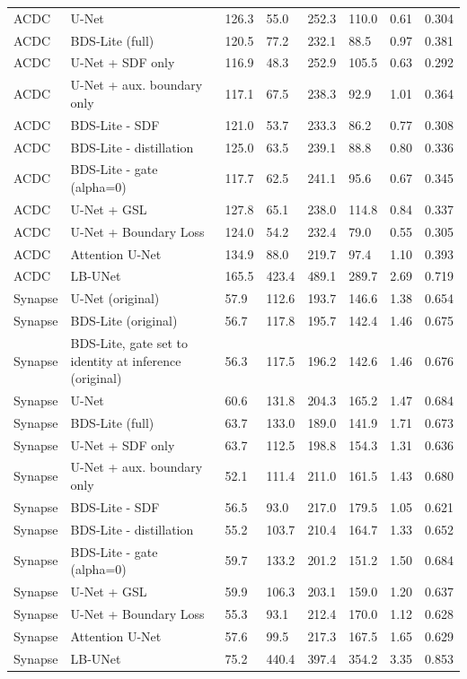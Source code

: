 \begin{longtable}{llllllll}
ACDC & U-Net & 126.3 & 55.0 & 252.3 & 110.0 & 0.61 & 0.304 \\
ACDC & BDS-Lite (full) & 120.5 & 77.2 & 232.1 & 88.5 & 0.97 & 0.381 \\
ACDC & U-Net + SDF only & 116.9 & 48.3 & 252.9 & 105.5 & 0.63 & 0.292 \\
ACDC & U-Net + aux. boundary only & 117.1 & 67.5 & 238.3 & 92.9 & 1.01 & 0.364 \\
ACDC & BDS-Lite - SDF & 121.0 & 53.7 & 233.3 & 86.2 & 0.77 & 0.308 \\
ACDC & BDS-Lite - distillation & 125.0 & 63.5 & 239.1 & 88.8 & 0.80 & 0.336 \\
ACDC & BDS-Lite - gate (alpha=0) & 117.7 & 62.5 & 241.1 & 95.6 & 0.67 & 0.345 \\
ACDC & U-Net + GSL & 127.8 & 65.1 & 238.0 & 114.8 & 0.84 & 0.337 \\
ACDC & U-Net + Boundary Loss & 124.0 & 54.2 & 232.4 & 79.0 & 0.55 & 0.305 \\
ACDC & Attention U-Net & 134.9 & 88.0 & 219.7 & 97.4 & 1.10 & 0.393 \\
ACDC & LB-UNet & 165.5 & 423.4 & 489.1 & 289.7 & 2.69 & 0.719 \\
Synapse & U-Net (original) & 57.9 & 112.6 & 193.7 & 146.6 & 1.38 & 0.654 \\
Synapse & BDS-Lite (original) & 56.7 & 117.8 & 195.7 & 142.4 & 1.46 & 0.675 \\
Synapse & BDS-Lite, gate set to identity at inference (original) & 56.3 & 117.5 & 196.2 & 142.6 & 1.46 & 0.676 \\
Synapse & U-Net & 60.6 & 131.8 & 204.3 & 165.2 & 1.47 & 0.684 \\
Synapse & BDS-Lite (full) & 63.7 & 133.0 & 189.0 & 141.9 & 1.71 & 0.673 \\
Synapse & U-Net + SDF only & 63.7 & 112.5 & 198.8 & 154.3 & 1.31 & 0.636 \\
Synapse & U-Net + aux. boundary only & 52.1 & 111.4 & 211.0 & 161.5 & 1.43 & 0.680 \\
Synapse & BDS-Lite - SDF & 56.5 & 93.0 & 217.0 & 179.5 & 1.05 & 0.621 \\
Synapse & BDS-Lite - distillation & 55.2 & 103.7 & 210.4 & 164.7 & 1.33 & 0.652 \\
Synapse & BDS-Lite - gate (alpha=0) & 59.7 & 133.2 & 201.2 & 151.2 & 1.50 & 0.684 \\
Synapse & U-Net + GSL & 59.9 & 106.3 & 203.1 & 159.0 & 1.20 & 0.637 \\
Synapse & U-Net + Boundary Loss & 55.3 & 93.1 & 212.4 & 170.0 & 1.12 & 0.628 \\
Synapse & Attention U-Net & 57.6 & 99.5 & 217.3 & 167.5 & 1.65 & 0.629 \\
Synapse & LB-UNet & 75.2 & 440.4 & 397.4 & 354.2 & 3.35 & 0.853 \\
\bottomrule
\end{longtable}

